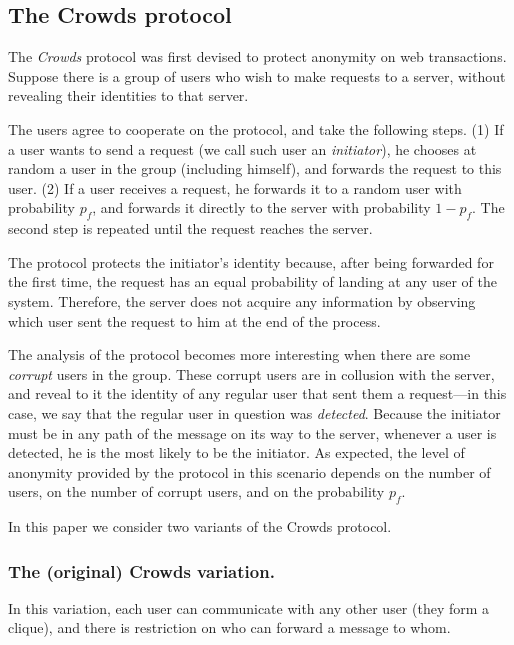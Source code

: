 \subsection{The Crowds protocol}

The \emph{Crowds} protocol was first devised to protect anonymity on web transactions. 
Suppose there is a group of users who wish to make requests to a server, 
without revealing their identities to that server. 

The users agree to cooperate on the protocol, and take the following steps.
(1) If a user wants to send a request (we call such user an \emph{initiator}), 
he chooses at random a user in the group (including himself), and forwards the 
request to this user.
(2) If a user receives a request, he forwards it to a random user with 
probability $p_f$, and forwards it directly to the server with probability $1{-}p_f$.
The second step is repeated until the request reaches the server. 

The protocol protects the initiator's identity because, after being 
forwarded for the first time, the request has an equal probability of 
landing at any user of the system. 
Therefore, the server does not acquire any information by observing 
which user sent the request to him at the end of the process.

The analysis of the protocol becomes more interesting when there are 
some \emph{corrupt} users in the group. 
These corrupt users are in collusion with the server, and reveal to 
it the identity of any regular user that sent them a request---in this case, 
we say that the regular user in question was \emph{detected}. 
Because the initiator must be in any path of the message on its way to the server, 
whenever a user is detected, he is the most likely to be the initiator. 
As expected, the level of anonymity provided by the protocol in this scenario depends 
on the number of users, on the number of corrupt users, and on the probability $p_f$.

In this paper we consider two variants of the Crowds protocol.

\subsubsection{The (original) Crowds variation.} 

In this variation, each user can communicate with any
other user (they form a clique), and there is  restriction 
on who can forward a message to whom.

